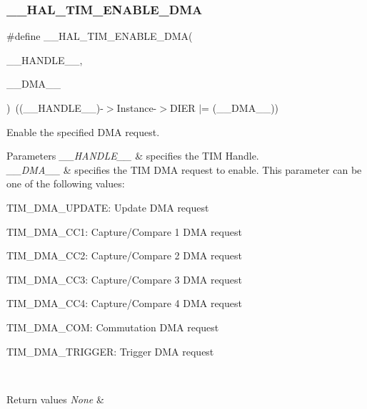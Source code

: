 \subsubsection{\texorpdfstring{\+\_\+\+\_\+\+H\+A\+L\+\_\+\+T\+I\+M\+\_\+\+E\+N\+A\+B\+L\+E\+\_\+\+D\+MA}{\_\_HAL\_TIM\_ENABLE\_DMA}}
{\footnotesize\ttfamily \#define \+\_\+\+\_\+\+H\+A\+L\+\_\+\+T\+I\+M\+\_\+\+E\+N\+A\+B\+L\+E\+\_\+\+D\+MA(\begin{DoxyParamCaption}\item[{}]{\+\_\+\+\_\+\+H\+A\+N\+D\+L\+E\+\_\+\+\_\+,  }\item[{}]{\+\_\+\+\_\+\+D\+M\+A\+\_\+\+\_\+ }\end{DoxyParamCaption})~((\+\_\+\+\_\+\+H\+A\+N\+D\+L\+E\+\_\+\+\_\+)-\/$>$Instance-\/$>$D\+I\+ER $\vert$= (\+\_\+\+\_\+\+D\+M\+A\+\_\+\+\_\+))}



Enable the specified D\+MA request. 


\begin{DoxyParams}{Parameters}
{\em \+\_\+\+\_\+\+H\+A\+N\+D\+L\+E\+\_\+\+\_\+} & specifies the T\+IM Handle. \\
\hline
{\em \+\_\+\+\_\+\+D\+M\+A\+\_\+\+\_\+} & specifies the T\+IM D\+MA request to enable. This parameter can be one of the following values\+: \begin{DoxyItemize}
\item T\+I\+M\+\_\+\+D\+M\+A\+\_\+\+U\+P\+D\+A\+TE\+: Update D\+MA request \item T\+I\+M\+\_\+\+D\+M\+A\+\_\+\+C\+C1\+: Capture/\+Compare 1 D\+MA request \item T\+I\+M\+\_\+\+D\+M\+A\+\_\+\+C\+C2\+: Capture/\+Compare 2 D\+MA request \item T\+I\+M\+\_\+\+D\+M\+A\+\_\+\+C\+C3\+: Capture/\+Compare 3 D\+MA request \item T\+I\+M\+\_\+\+D\+M\+A\+\_\+\+C\+C4\+: Capture/\+Compare 4 D\+MA request \item T\+I\+M\+\_\+\+D\+M\+A\+\_\+\+C\+OM\+: Commutation D\+MA request \item T\+I\+M\+\_\+\+D\+M\+A\+\_\+\+T\+R\+I\+G\+G\+ER\+: Trigger D\+MA request \end{DoxyItemize}
\\
\hline
\end{DoxyParams}

\begin{DoxyRetVals}{Return values}
{\em None} & \\
\hline
\end{DoxyRetVals}
\mbox{\label{group___t_i_m___exported___macros_ga4d69943bc4716743c78e3194e259097e}} 
